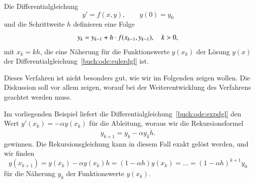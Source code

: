\begin{satz}
%
Die Differentialgleichung
\begin{equation}
y'=f(x,y),\qquad y(0)=y_0
\label{buch:ode:eulerdgl}
\end{equation}
und die Schrittweite $h$ definieren eine Folge 
\[
y_{\mathstrut k}=y_{k-1} + h\cdot f(x_{k-1}, y_{k-1}),\quad k>0,
\]
mit $x_k=kh$,
die eine Näherung für die Funktionswerte $y(x_k)$ der Lösung $y(x)$
der Differentialgleichung~\eqref{buch:ode:eulerdgl} ist.
\end{satz}

Dieses Verfahren ist nicht besonders gut, wie wir im Folgenden zeigen
wollen.
Die Diskussion soll vor allem zeigen, worauf bei der Weiterentwicklung
des Verfahrens geachtet werden muss.

Im vorliegenden Beispiel liefert die
Differentialgleichung~\eqref{buch:ode:expdgl}
den Wert $y'(x_k)=-\alpha y(x_k)$ für die Ableitung,
woraus wir die Rekursionsformel
\[
y_{k+1}=y_k - \alpha y_k \dot h.
\]
gewinnen.
Die Rekursionsgleichung kann in diesem Fall exakt gelöst werden,
und wir finden
\begin{equation}
y(x_{k+1}) = y(x_k)-\alpha y(x_k) h=(1-\alpha h) y(x_k)=\dots
=(1-\alpha h)^{k+1}y_0
\label{buch:ode:rekursion}
\end{equation}
für die Näherung $y_k$ der Funktionswerte $y(x_k)$.



